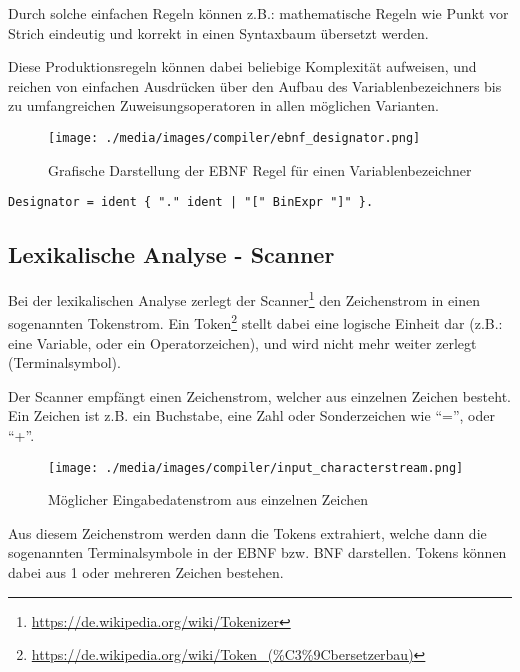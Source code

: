 Durch solche einfachen Regeln können z.B.: mathematische Regeln wie Punkt vor Strich eindeutig und korrekt in einen Syntaxbaum übersetzt werden.

Diese Produktionsregeln k\"onnen dabei beliebige Komplexit\"at aufweisen, und reichen von einfachen Ausdr\"ucken \"uber den Aufbau des Variablenbezeichners bis zu umfangreichen Zuweisungsoperatoren in allen m\"oglichen Varianten.

\begin{figure}[h]
\centering
\texttt{[image: ./media/images/compiler/ebnf\_designator.png]}
\caption{Grafische Darstellung der EBNF Regel f\"ur einen Variablenbezeichner}
\label{compiler_ebnf_designator}
\end{figure}

\begin{lstlisting}[language=EBNF]
Designator = ident { "." ident | "[" BinExpr "]" }.
\end{lstlisting}


\newpage
\subsection{Lexikalische Analyse - Scanner}

Bei der lexikalischen Analyse zerlegt der Scanner\footnote{\url{https://de.wikipedia.org/wiki/Tokenizer}} den Zeichenstrom in einen sogenannten Tokenstrom. Ein Token\footnote{\url{https://de.wikipedia.org/wiki/Token_(\%C3\%9Cbersetzerbau)}} stellt dabei eine logische Einheit dar (z.B.: eine Variable, oder ein Operatorzeichen), und wird nicht mehr weiter zerlegt (Terminalsymbol).


Der Scanner empf\"angt einen Zeichenstrom, welcher aus einzelnen Zeichen besteht. Ein Zeichen ist z.B. ein Buchstabe, eine Zahl oder Sonderzeichen wie ``='', oder ``+''.

\begin{figure}[h]
\centering
\texttt{[image: ./media/images/compiler/input\_characterstream.png]}
\caption{M\"oglicher Eingabedatenstrom aus einzelnen Zeichen}
\label{compiler_input_characterstream}
\end{figure}


Aus diesem Zeichenstrom werden dann die Tokens extrahiert, welche dann die sogenannten Terminalsymbole in der EBNF bzw. BNF darstellen. Tokens k\"onnen dabei aus 1 oder mehreren Zeichen bestehen.

